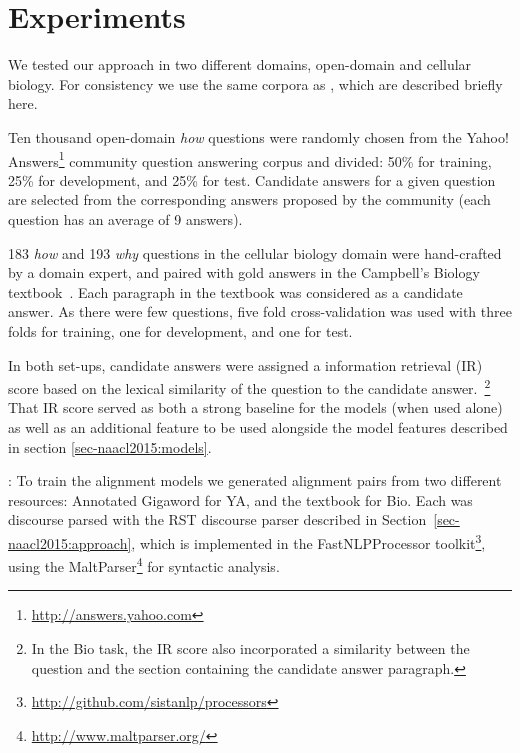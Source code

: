 \section{Experiments}
\label{sec-naacl2015:experiments}



We tested our approach in two different domains, open-domain and cellular biology. For consistency we use the same corpora as \citet{jansen14}, which are described briefly here. 

{}  Ten thousand open-domain \emph{how} questions were randomly chosen from the Yahoo! Answers\footnote{\url{http://answers.yahoo.com}} community question answering corpus and divided: 50\% for training, 25\% for development, and 25\% for test.  Candidate answers for a given question are selected from the corresponding answers proposed by the community (each question has an average of 9 answers).

{} 183 \emph{how} and 193 \emph{why}  questions in the cellular biology domain were hand-crafted by a domain expert, and paired with gold answers in the Campbell's Biology textbook~\citep{Reece:2011}.  Each paragraph in the textbook was considered as a candidate answer.  As there were few questions, five fold cross-validation was used with three folds for training, one for development, and one for test.

In both set-ups, candidate answers were assigned a information retrieval (IR) score based on the lexical similarity of the question to the candidate answer.~\footnote{In the Bio task, the IR score also incorporated a similarity between the question and the section containing the candidate answer paragraph.}  That IR score served as both a strong baseline for the models (when used alone) as well as an additional feature to be used alongside the model features described in section \ref{sec-naacl2015:models}.

{}: To train the alignment models we generated alignment pairs from two different resources: Annotated Gigaword \citep{Napoles2012} for YA, and the textbook for Bio.  Each was discourse parsed with the RST discourse parser described in Section~\ref{sec-naacl2015:approach}, which is implemented in the FastNLPProcessor toolkit\footnote{\url{http://github.com/sistanlp/processors}}, using the MaltParser\footnote{\url{http://www.maltparser.org/}} for syntactic analysis.


